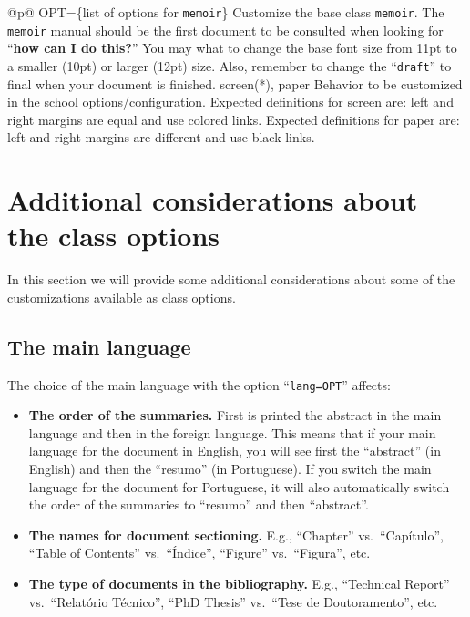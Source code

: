 \begin{ctabular}{@{}p{\linewidth}@{}}
    {OPT=\{list of options for \texttt{memoir}\}}%
    {Customize the base class \texttt{memoir}. The \texttt{memoir} manual should be the first document to be consulted when looking for “\textbf{how can I do this?}” You may what to change the base font size from 11pt to a smaller (10pt) or larger (12pt) size.  Also, remember to change the “\texttt{draft}” to final when your document is finished.}
    \midrule
    {screen(*), paper}%
    {Behavior to be customized in the school options/configuration. Expected definitions for screen are: left and right margins are equal and use colored links. Expected definitions for paper are: left and right margins are different and use black links.}
    \bottomrule
\end{ctabular}

\section{Additional considerations about the class options} %
\label{sec:additional_considerations}

In this section we will provide some additional considerations about some of the customizations available as class options.

\subsection{The main language} %
\label{sub:the_main_language}

The choice of the main language with the option “\texttt{lang=OPT}” affects:

\begin{itemize}
	\item \textbf{The order of the summaries.} First is printed the abstract in the main language and then in the foreign language. This means that if your main language for the document in English, you will see first the “abstract” (in English) and then the “resumo” (in Portuguese). If you switch the main language for the document for Portuguese, it will also automatically switch the order of the summaries to “resumo” and then “abstract”.
	\item \textbf{The names for document sectioning.} E.g., ``Chapter'' vs.\ ``Capítulo'', ``Table of Contents'' vs.\ ``Índice'', ``Figure'' vs.\ ``Figura'', etc.
	\item \textbf{The type of documents in the bibliography.} E.g., ``Technical Report'' vs.\ ``Relatório Técnico'', ``PhD Thesis'' vs.\ ``Tese de Doutoramento'', etc.
\end{itemize} 

